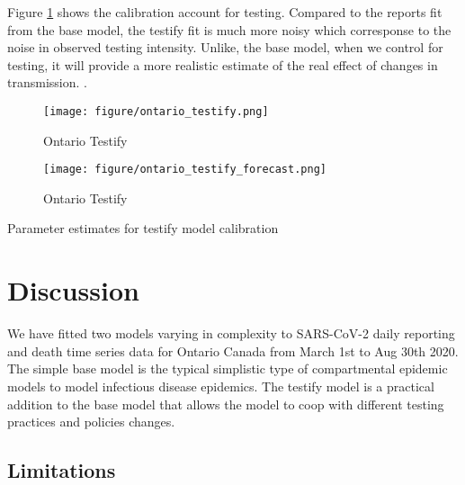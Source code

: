 \documentclass[12pt]{article}\usepackage[]{graphicx}\usepackage[]{color}
\begin{document}
\FloatBarrier

Figure \ref{fig:Ont_calibration_testify} shows the calibration account for testing. 
Compared to the reports fit from the base model, the testify fit is much more noisy which corresponse to the noise in observed testing intensity. 
Unlike, the base model, when we control for testing, it will provide a more realistic estimate of the real effect of changes in transmission.
.

\begin{figure}[ht!]
\color{fgcolor}
\texttt{[image: figure/ontario\_testify.png]}

\caption{Ontario Testify}
\label{fig:Ont_calibration_testify}
\end{figure}

\begin{figure}[ht!]
\color{fgcolor}
\texttt{[image: figure/ontario\_testify\_forecast.png]}

\caption{Ontario Testify}
\label{fig:Ont_calibration_testify_forecast}
\end{figure}

\begin{table}
\centering

\caption{Parameter estimates for testify model calibration}
\label{table:testify}

\end{table}

\FloatBarrier

\section{Discussion}

We have fitted two models varying in complexity to SARS-CoV-2 daily reporting and death time series data for Ontario Canada from March 1st to Aug 30th 2020. 
The simple base model is the typical simplistic type of compartmental epidemic models to model infectious disease epidemics. 
The testify model is a practical addition to the base model that allows the model to coop with different testing practices and policies changes.

\subsection{Limitations}
\end{document}
